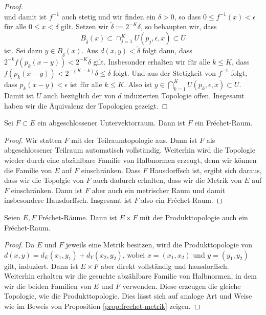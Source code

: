 \begin{proof}
\[  \]
  und damit ist $f^{-1}$ auch stetig und wir finden ein $\delta > 0$,
  so dass $0 \leq f^{-1}(x) < \epsilon$ für alle $0 \leq x <
  \delta$ gilt. Setzen wir $\tilde \delta := 2^{-K} \delta$, so behaupten
  wir, dass
  \[
  B_{\tilde \delta}(x) \subset \cap_{j=1}^K U(p_j,
  \epsilon, x) \subset U
  \]
  ist. Sei dazu $y \in B_{\tilde
      \delta}(x)$. Aus $d(x,y) < \tilde \delta$ folgt dann, dass
    $2^{-k} f(p_k(x-y)) < 2^{-K} \delta$ gilt. Insbesonder erhalten
    wir für alle $k \leq K$, dass $f(p_k(x-y)) < 2^{-(K-k)} \delta
    \leq \delta$ folgt. Und aus der Stetigkeit von $f^{-1}$ folgt, dass
    $p_k(x-y) < \epsilon$ ist für alle $k \leq K$. Also ist $y \in
    \bigcap_{k=1}^K U(p_k, \epsilon, x) \subset U$. Damit ist $U$ auch
    bezüglich der von $d$ induzierten Topologie offen. Insgesamt haben
    wir die Äquivalenz der Topologien gezeigt.
\end{proof}
  
\begin{thm}
  \label{thm:frechet-abgeschlossen}
  Sei $F \subset E$ ein abgeschlossener Untervektorraum. Dann ist $F$
  ein Fr\'echet-Raum.
\end{thm}

\begin{proof}
  Wir statten $F$ mit der Teilraumtopologie aus. Dann ist $F$
  als abgeschlossener Teilraum automatisch vollständig. Weiterhin wird
  die Topologie wieder durch eine abzählbare Familie von Halbnormen
  erzeugt, denn wir können die Familie von $E$ auf $F$
  einschränken. Dass $F$ Hausdorffsch ist, ergibt sich daraus, dass
  wir die Topolgie von $F$ auch dadurch erhalten, dass wir die Metrik
  von $E$ auf $F$ einschränken. Dann ist $F$ aber auch ein metrischer
  Raum und damit insbesondere Hausdorffsch. Insgesamt ist $F$ also ein
  Fr\'echet-Raum.
\end{proof}

\begin{thm}
  \label{thm:frechet-summe}
  Seien $E, F$ Fr\'echet-Räume. Dann ist $E \times F$ mit der
  Produkttopologie auch ein Fr\'echet-Raum.
\end{thm}

\begin{proof}
  Da $E$ und $F$ jeweils eine Metrik besitzen, wird die
  Produkttopologie von $d(x,y) = d_E(x_1, y_1) + d_Y(x_2, y_2)$, wobei
  $x = (x_1,x_2)$ und $y = (y_1, y_2)$ gilt, induziert. Dann ist $E
  \times F$ aber direkt vollständig und hausdorffsch. Weiterhin
  erhalten wir die gesuchte abzählbare Familie von Halbnormen, in dem
  wir die beiden Familien von $E$ und $F$ verwenden. Diese erzeugen
  die gleiche Topologie, wie die Produkttopologie. Dies lässt sich auf
  analoge Art und Weise wie im Beweis von Proposition
  \ref{prop:frechet-metrik} zeigen.
\end{proof}

